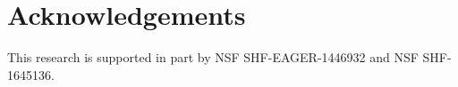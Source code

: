 \documentclass[conference]{IEEEtran}
\begin{document}
\begin{abstract}
%

\end{abstract}




















\balance
\iftrue
\section*{Acknowledgements}
This research is supported in part by NSF SHF-EAGER-1446932 and  NSF SHF-1645136.
\fi



\end{document}
